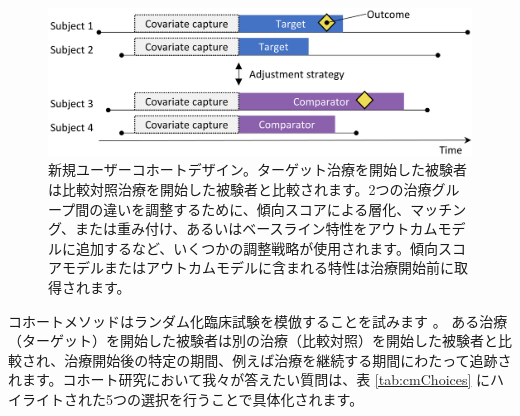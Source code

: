 \documentclass[
  11pt]{book}
\theoremstyle{definition}
\theoremstyle{definition}
\theoremstyle{definition}
\theoremstyle{definition}
\theoremstyle{remark}
\begin{document}

\begin{figure}

{\centering \includegraphics[width=0.9\linewidth]{images/PopulationLevelEstimation/cohortMethod} 

}

\caption{新規ユーザーコホートデザイン。ターゲット治療を開始した被験者は比較対照治療を開始した被験者と比較されます。2つの治療グループ間の違いを調整するために、傾向スコアによる層化、マッチング、または重み付け、あるいはベースライン特性をアウトカムモデルに追加するなど、いくつかの調整戦略が使用されます。傾向スコアモデルまたはアウトカムモデルに含まれる特性は治療開始前に取得されます。}\label{fig:cohortMethod}
\end{figure}

コホートメソッドはランダム化臨床試験を模倣することを試みます \citep{hernan_2016}。 ある治療（ターゲット）を開始した被験者は別の治療（比較対照）を開始した被験者と比較され、治療開始後の特定の期間、例えば治療を継続する期間にわたって追跡されます。コホート研究において我々が答えたい質問は、表 \ref{tab:cmChoices} にハイライトされた5つの選択を行うことで具体化されます。   
\end{document}
